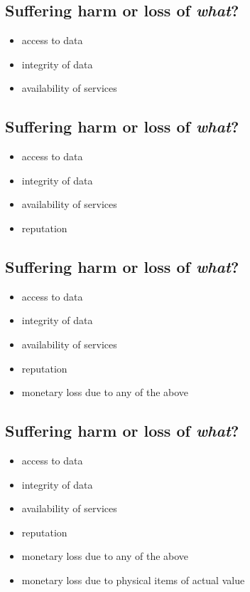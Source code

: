 \documentclass[xga]{xdvislides}
\begin{document}
\subsection{Suffering harm or loss of {\em what}?}

\begin{itemize}
	\item access to data
	\item integrity of data
	\item availability of services
\end{itemize}

\subsection{Suffering harm or loss of {\em what}?}

\begin{itemize}
	\item access to data
	\item integrity of data
	\item availability of services
	\item reputation
\end{itemize}

\subsection{Suffering harm or loss of {\em what}?}

\begin{itemize}
	\item access to data
	\item integrity of data
	\item availability of services
	\item reputation
	\item monetary loss due to any of the above
\end{itemize}

\subsection{Suffering harm or loss of {\em what}?}

\begin{itemize}
	\item access to data
	\item integrity of data
	\item availability of services
	\item reputation
	\item monetary loss due to any of the above
	\item monetary loss due to physical items of actual value
\end{itemize}
\end{document}
